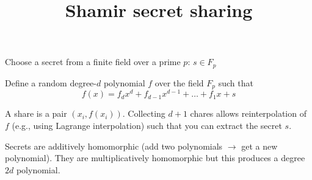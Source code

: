 \documentclass{article}
\begin{document}
\title{Shamir secret sharing}
\date{}
\maketitle

Choose a secret from a finite field over a prime $p$: $s \in F_p$

Define a random degree-$d$ polynomial $f$ over the field $F_p$ such that
\[ f(x) = f_d x^d + f_{d-1}x^{d-1} + \dots + f_1x + s \]

A share is a pair $(x_i, f(x_i))$. Collecting $d+1$ chares allows reinterpolation of $f$ (e.g., using Lagrange interpolation) such that you can extract the secret $s$.

Secrets are additively homomorphic (add two polynomials $\to$ get a new polynomial). They are multiplicatively homomorphic but this produces a degree $2d$ polynomial.
\end{document}
